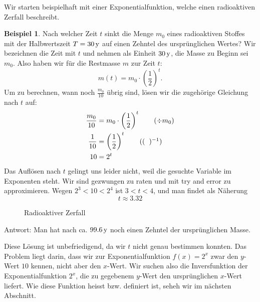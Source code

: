 \documentclass[%
11pt,%
twoside,%
titlepage,%
swissgerman,%
headsepline%
]{scrartcl}
\theoremstyle{definition}
\newtheorem{bsp}{Beispiel}[subsection] %
\theoremstyle{plain}
\begin{document}
Wir starten beispielhaft mit einer Exponentialfunktion, welche einen radioaktiven Zerfall beschreibt.
\begin{bsp}
Nach welcher Zeit $t$ sinkt die Menge $m_0$ eines radioaktiven Stoffes mit der Halbwertszeit $T=\unit[30]{y}$ auf einen Zehntel des ursprünglichen Wertes? Wir bezeichnen die Zeit mit $t$ und nehmen als Einheit $\unit[30]{y}$, die Masse zu Beginn sei $m_0$. Also haben wir für die Restmasse $m$ zur Zeit $t$:
$$m(t)=m_0\cdot\left(\frac{1}{2}\right)^t.$$
Um zu berechnen, wann noch $\frac{m_0}{10}$ übrig sind, lösen wir die zugehörige Gleichung nach $t$ auf:
    \begin{align*}
    \frac{m_0}{10}&=m_0\cdot\left(\frac{1}{2}\right)^t\tag{$\div m_0$}\\
    \frac{1}{10}&=\left(\frac{1}{2}\right)^t\tag{$(\phantom{x})^{-1}$}\\
    10&=2^t
    \end{align*}
    Das Auflösen nach $t$ gelingt uns leider nicht, weil die gesuchte Variable
    im Exponenten steht. Wir sind gezwungen zu raten und mit try and error zu approximieren. Wegen
    $2^3<10<2^4$ ist $3<t<4$, und man findet als Näherung
    $$t\approx3.32$$    
\begin{figure}
\begin{center}
\end{center}
\caption{Radioaktiver Zerfall}\label{zerfall}
\end{figure}

   Antwort: Man hat nach ca. $\unit[99.6]{y}$
    noch einen Zehntel der ursprünglichen Masse.
    \end{bsp}
  Diese Lösung ist unbefriedigend, da wir $t$ nicht genau bestimmen
  konnten. Das Problem liegt darin, dass wir zur Exponentialfunktion $f(x)=2^x$ zwar den $y$-Wert $10$ kennen, nicht aber den $x$-Wert. Wir suchen also die Inversfunktion der Exponentialfunktion $2^x$, die zu gegebenem $y$-Wert den ursprünglichen $x$-Wert liefert. Wie diese Funktion heisst bzw. definiert ist, seheh wir im nächsten Abschnitt.
  
\end{document}
